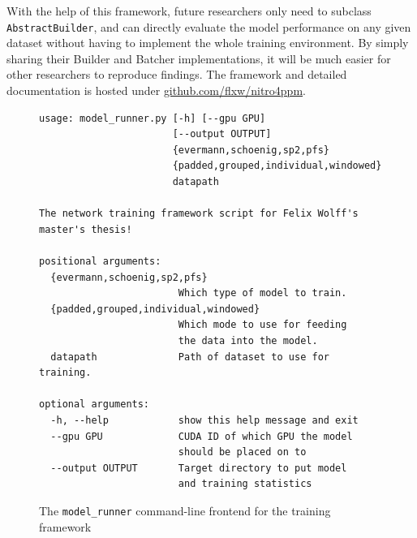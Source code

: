 With the help of this framework, future researchers only need to subclass \verb=AbstractBuilder=, and can directly evaluate the model performance on any given dataset without having to implement the whole training environment. By simply sharing their Builder and Batcher implementations, it will be much easier for other researchers to reproduce findings. The framework and detailed documentation is hosted under \href{https://github.com/flxw/nitro4ppm}{github.com/flxw/nitro4ppm}.

\begin{figure}
\centering
\begin{verbatim}
usage: model_runner.py [-h] [--gpu GPU]
                       [--output OUTPUT]
                       {evermann,schoenig,sp2,pfs}
                       {padded,grouped,individual,windowed}
                       datapath

The network training framework script for Felix Wolff's master's thesis!

positional arguments:
  {evermann,schoenig,sp2,pfs}
                        Which type of model to train.
  {padded,grouped,individual,windowed}
                        Which mode to use for feeding
                        the data into the model.
  datapath              Path of dataset to use for training.

optional arguments:
  -h, --help            show this help message and exit
  --gpu GPU             CUDA ID of which GPU the model
                        should be placed on to
  --output OUTPUT       Target directory to put model
                        and training statistics
\end{verbatim}
\caption[CLI frontend for the framework]{The \texttt{model\_runner} command-line frontend for the training framework}
\label{fig:framework-frontend}
\end{figure}
